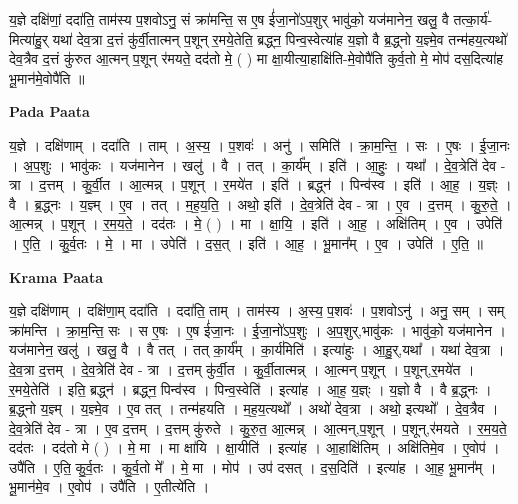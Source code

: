 \documentclass[17pt]{extarticle}
\begin{document}
य॒ज्ञे दक्षि॑णां॒ ददा॑ति॒ ताम॑स्य प॒शवोऽनु॒ सं क्रा॑मन्ति॒ स ए॒ष ई॑जा॒नो॑ऽप॒शुर् भावु॑को॒ यज॑मानेन॒ खलु॒ वै तत्का॒र्य॑-मित्या॑हु॒र् यथा॑ देव॒त्रा द॒त्तं कु॑र्वी॒तात्मन् प॒शून् र॒मये॒तेति॒ ब्रद्ध्न॒ पिन्व॒स्वेत्या॑ह य॒ज्ञो वै ब्र॒द्ध्नो य॒ज्ञ्मे॒व तन्म॑हय॒त्यथो॑ देव॒त्रैव द॒त्तं कु॑रुत आ॒त्मन् प॒शून् र॑मयते॒ दद॑तो मे॒ ( ) मा क्षा॒यीत्या॒हाक्षि॑ति-मे॒वोपै॑ति कुर्व॒तो मे॒ मोप॑ दस॒दित्या॑ह भू॒मान॑मे॒वोपै॑ति ॥ \newline

\textbf{Pada Paata} \newline

य॒ज्ञे । दक्षि॑णाम् । ददा॑ति । ताम् । अ॒स्य॒ । प॒शवः॑ । अनु॑ । समिति॑ । क्रा॒म॒न्ति॒ । सः । ए॒षः । ई॒जा॒नः । अ॒प॒शुः । भावु॑कः । यज॑मानेन । खलु॑ । वै । तत् । का॒र्य᳚म् । इति॑ । आ॒हुः॒ । यथा᳚ । दे॒व॒त्रेति॑ देव - त्रा । द॒त्तम् । कु॒र्वी॒त । आ॒त्मन्न् । प॒शून् । र॒मये॑त । इति॑ । ब्रद्ध्न॑ । पिन्व॑स्व । इति॑ । आ॒ह॒ । य॒ज्ञ्ः । वै । ब्र॒द्ध्नः । य॒ज्ञ्म् । ए॒व । तत् । म॒ह॒य॒ति॒ । अथो॒ इति॑ । दे॒व॒त्रेति॑ देव - त्रा । ए॒व । द॒त्तम् । कु॒रु॒ते॒ । आ॒त्मन्न् । प॒शून् । र॒म॒य॒ते॒ । दद॑तः । मे॒ ( ) । मा । क्षा॒यि॒ । इति॑ । आ॒ह॒ । अक्षि॑तिम् । ए॒व । उपेति॑ । ए॒ति॒ । कु॒र्व॒तः । मे॒ । मा । उपेति॑ । द॒स॒त् । इति॑ । आ॒ह॒ । भू॒मान᳚म् । ए॒व । उपेति॑ । ए॒ति॒ ॥  \newline


\textbf{Krama Paata} \newline

य॒ज्ञे दक्षि॑णाम् । दक्षि॑णा॒म् ददा॑ति । ददा॑ति॒ ताम् । ताम॑स्य । अ॒स्य॒ प॒शवः॑ । प॒शवोऽनु॑ । अनु॒ सम् । सम् क्रा॑मन्ति । क्रा॒म॒न्ति॒ सः । स ए॒षः । ए॒ष ई॑जा॒नः । ई॒जा॒नो॑ऽप॒शुः । अ॒प॒शुर्,भावु॑कः । भावु॑को॒ यज॑मानेन । यज॑मानेन॒ खलु॑ । खलु॒ वै । वै तत् । तत् का॒र्य᳚म् । का॒र्य॑मिति॑ । इत्या॑हुः । आ॒हु॒र्,यथा᳚ । यथा॑ देव॒त्रा । दे॒व॒त्रा द॒त्तम् । दे॒व॒त्रेति॑ देव - त्रा । द॒त्तम् कु॑र्वी॒त । कु॒र्वी॒तात्मन्न् । आ॒त्मन् प॒शून् । प॒शून्,र॒मये॑त । र॒मये॒तेति॑ । इति॒ ब्रद्ध्न॑ । ब्रद्ध्न॒ पिन्व॑स्व । पिन्व॒स्वेति॑ । इत्या॑ह । आ॒ह॒ य॒ज्ञ्ः । य॒ज्ञो वै । वै ब्र॒द्ध्नः । ब्र॒द्ध्नो य॒ज्ञ्म् । य॒ज्ञ्मे॒व । ए॒व तत् । तन्म॑हयति । म॒ह॒य॒त्यथो᳚ । अथो॑ देव॒त्रा । अथो॒ इत्यथो᳚ । दे॒व॒त्रैव । दे॒व॒त्रेति॑ देव - त्रा । ए॒व द॒त्तम् । द॒त्तम् कु॑रुते । कु॒रु॒त॒ आ॒त्मन्न् । आ॒त्मन्,प॒शून् । प॒शून्,र॑मयते । र॒म॒य॒ते॒ दद॑तः । दद॑तो मे ( ) । मे॒ मा । मा क्षा॑यि । क्षा॒यीति॑ । इत्या॑ह । आ॒हाक्षि॑तिम् । अक्षि॑तिमे॒व । ए॒वोप॑ । उपै॑ति । ए॒ति॒ कु॒र्व॒तः । कु॒र्व॒तो मे᳚ । मे॒ मा । मोप॑ । उप॑ दसत् । द॒स॒दिति॑ । इत्या॑ह । आ॒ह॒ भू॒मान᳚म् । भू॒मान॑मे॒व । ए॒वोप॑ । उपै॑ति । ए॒तीत्ये॑ति । \newline
\end{document}
